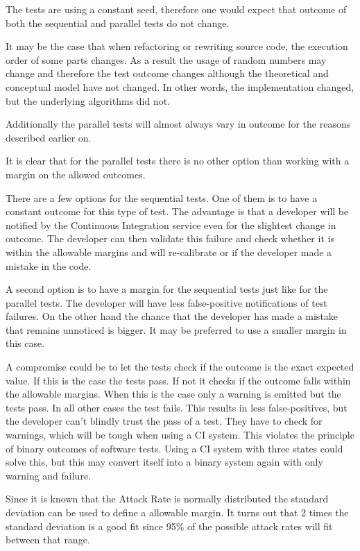 \documentclass[natbib=true]{acmart}
\begin{document}
The tests are using a constant seed, therefore one would expect that outcome of both the sequential and parallel tests do not change.

It may be the case that when refactoring or rewriting source code, the execution order of some parts changes.
As a result the usage of random numbers may change and therefore the test outcome changes although the theoretical and conceptual model have not changed. In other words, the implementation changed, but the underlying algorithms did not. 

Additionally the parallel tests will almost always vary in outcome for the reasons described earlier on.

It is clear that for the parallel tests there is no other option than working with a margin on the allowed outcomes.

There are a few options for the sequential tests. One of them is to have a constant outcome for this type of test.
The advantage is that a developer will be notified by the Continuous Integration service even for the slightest change in outcome. The developer can then validate this failure and check whether it is within the allowable margins and will re-calibrate or if the developer made a mistake in the code.

A second option is to have a margin for the sequential tests just like for the parallel tests. The developer will have less false-positive notifications of test failures.
On the other hand the chance that the developer has made a mistake that remains unnoticed is bigger. It may be preferred to use a smaller margin in this case.

A compromise could be to let the tests check if the outcome is the exact expected value. If this is the case the tests pass.
If not it checks if the outcome falls within the allowable margins. When this is the case only a warning is emitted but the tests pass. In all other cases the test fails.
This results in less false-positives, but the developer can't blindly trust the pass of a test. They have to check for warnings, which will be tough when using a CI system. %
This violates the principle of binary outcomes of software tests. 
Using a CI system with three states could solve this, but this may convert itself into a binary system again with only warning and failure.


Since it is known that the Attack Rate is normally distributed the standard deviation can be used to define a allowable margin.
It turns out that 2 times the standard deviation is a good fit since 95\% of the possible attack rates will fit between that range. 
\end{document}
